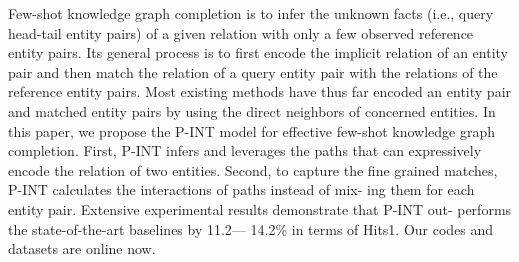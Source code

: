 Few-shot knowledge graph completion is to infer the unknown facts (i.e., query head-tail entity pairs) of a given relation with only a few observed reference entity pairs. Its general process is to first encode the implicit relation of an entity pair and then match the relation of a query entity pair with the relations of the reference entity pairs. Most existing methods have thus far encoded an entity pair and matched entity pairs by using the direct neighbors of concerned entities. In this paper, we propose the P-INT model for effective few-shot knowledge graph completion. First, P-INT infers and leverages the paths that can expressively encode the relation of two entities. Second, to capture the fine grained matches, P-INT calculates the interactions of paths instead of mix- ing them for each entity pair. Extensive experimental results demonstrate that P-INT out- performs the state-of-the-art baselines by 11.2--- 14.2\% in terms of Hits\@1. Our codes and datasets are online now.
